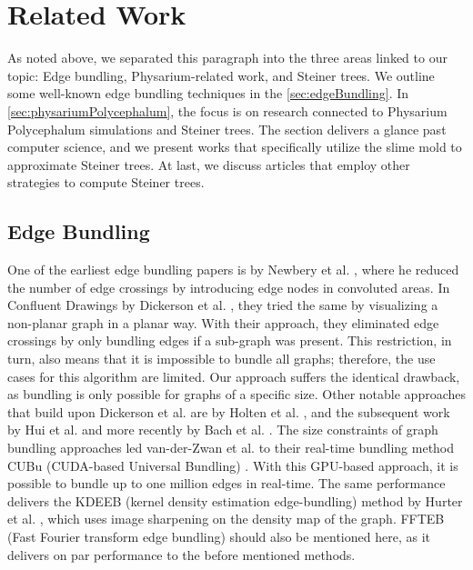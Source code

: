 
\chapter{Related Work}
\label{sec:relatedWork}

As noted above, we separated this paragraph into the three areas linked to our topic: Edge bundling, Physarium-related work, and Steiner trees. We outline some well-known edge bundling techniques in the \autoref{sec:edgeBundling}. In \autoref{sec:physariumPolycephalum}, the focus is on research connected to Physarium Polycephalum simulations and Steiner trees. The section delivers a glance past computer science, and we present works that specifically utilize the slime mold to approximate Steiner trees. At last, we discuss articles that employ other strategies to compute Steiner trees.

\section{Edge Bundling}
\label{sec:edgeBundling}

One of the earliest edge bundling papers is by Newbery et al. \cite{newbery_edge_1989}, where he reduced the number of edge crossings by introducing edge nodes in convoluted areas. In Confluent Drawings by Dickerson et al. \cite{dickerson_confluent_2002}, they tried the same by visualizing a non-planar graph in a planar way. With their approach, they eliminated edge crossings by only bundling edges if a sub-graph was present. This restriction, in turn, also means that it is impossible to bundle all graphs; therefore, the use cases for this algorithm are limited. Our approach suffers the identical drawback, as bundling is only possible for graphs of a specific size. Other notable approaches that build upon Dickerson et al. are by Holten et al. \cite{holten_hierarchical_2006}, and the subsequent work by Hui et al. \cite{hui_train_2007} and more recently by Bach et al. \cite{bach_towards_2017}.
The size constraints of graph bundling approaches led van-der-Zwan et al. to their real-time bundling method CUBu (CUDA-based Universal Bundling) \cite{van_der_zwan_cubu_2016}. With this GPU-based approach, it is possible to bundle up to one million edges in real-time. The same performance delivers the KDEEB (kernel density estimation edge-bundling) method by Hurter et al. \cite{hurter_graph_2012}, which uses image sharpening on the density map of the graph. FFTEB (Fast Fourier transform edge bundling) \cite{lhuillier_ffteb_2017} should also be mentioned here, as it delivers on par performance to the before mentioned methods.

